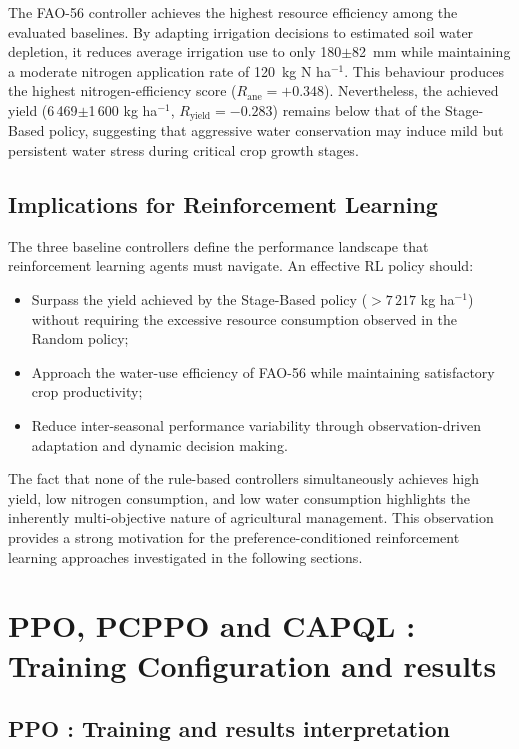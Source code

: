 The FAO-56 controller achieves the highest resource efficiency among the evaluated baselines. By adapting irrigation decisions to estimated soil water depletion, it reduces average irrigation use to only 180$\pm$82~mm while maintaining a moderate nitrogen application rate of 120~kg N ha$^{-1}$. This behaviour produces the highest nitrogen-efficiency score ($R_{\text{ane}} = +0.348$). Nevertheless, the achieved yield (6\,469$\pm$1\,600 kg ha$^{-1}$, $R_{\text{yield}} = -0.283$) remains below that of the Stage-Based policy, suggesting that aggressive water conservation may induce mild but persistent water stress during critical crop growth stages.


\subsection{Implications for Reinforcement Learning}

The three baseline controllers define the performance landscape that reinforcement learning agents must navigate. An effective RL policy should:
\begin{itemize}
  \item Surpass the yield achieved by the Stage-Based policy ($> 7\,217$ kg ha$^{-1}$) without requiring the excessive resource consumption observed in the Random policy;
  \item Approach the water-use efficiency of FAO-56 while maintaining satisfactory crop productivity;
  \item Reduce inter-seasonal performance variability through observation-driven adaptation and dynamic decision making.
\end{itemize}
The fact that none of the rule-based controllers simultaneously achieves high yield, low nitrogen consumption, and low water consumption highlights the inherently multi-objective nature of agricultural management. This observation provides a strong motivation for the preference-conditioned reinforcement learning approaches investigated in the following sections.


\section{PPO, PCPPO and CAPQL : Training Configuration and results}

\subsection{PPO : Training and results interpretation}



